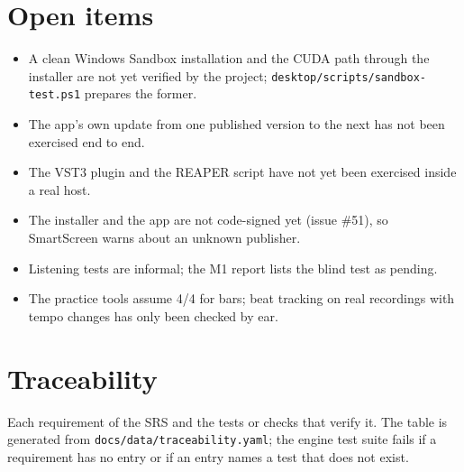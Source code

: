 \documentclass{covermaker}
\begin{document}
\section{Open items}
\begin{itemize}
  \item A clean Windows Sandbox installation and the CUDA path through the
  installer are not yet verified by the project; \texttt{desktop/scripts/sandbox-test.ps1}
  prepares the former.
  \item The app's own update from one published version to the next has not
  been exercised end to end.
  \item The VST3 plugin and the REAPER script have not yet been exercised
  inside a real host.
  \item The installer and the app are not code-signed yet (issue \#51), so
  SmartScreen warns about an unknown publisher.
  \item Listening tests are informal; the M1 report lists the blind test as
  pending.
  \item The practice tools assume 4/4 for bars; beat tracking on real
  recordings with tempo changes has only been checked by ear.
\end{itemize}

\section{Traceability}
Each requirement of the SRS and the tests or checks that verify it. The table
is generated from \texttt{docs/data/traceability.yaml}; the engine test suite
fails if a requirement has no entry or if an entry names a test that does not
exist.



\printnoidxglossaries
\end{document}
